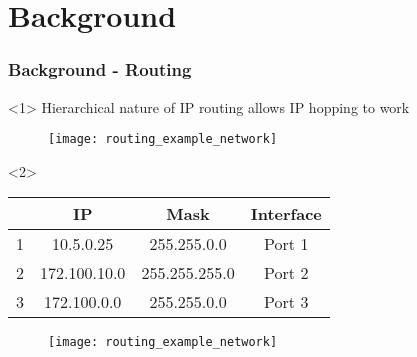 \documentclass{beamer}
\begin{document}
\section{Background}
\begin{frame}
	\frametitle{Background - Routing}

	\begin{onlyenv}
	Hierarchical nature of IP routing allows IP hopping to work
	\vspace{-10pt}
	\begin{figure}
	\centering
	\texttt{[image: routing\_example\_network]}
	\end{figure}
	\end{onlyenv}

	\begin{onlyenv}
	\scriptsize{%
	\begin{table}
	\centering
	\begin{tabular}{rccc}
	\toprule
	 & \textbf{IP} & \textbf{Mask} & \textbf{Interface}\\
	\hline
	1 & 10.5.0.25 & 255.255.0.0 & Port 1\\
	2 & 172.100.10.0 & 255.255.255.0 & Port 2\\
	3 & 172.100.0.0 & 255.255.0.0 & Port 3\\
	\bottomrule
	\end{tabular}
	\end{table}%
	}
	\vspace{-25pt}
	\begin{figure}
	\centering
	\texttt{[image: routing\_example\_network]}
	\end{figure}
	\end{onlyenv}
\end{frame}
\end{document}
